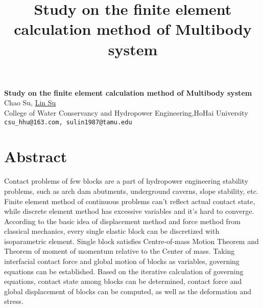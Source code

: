 \title{Study on the finite element calculation method of Multibody system}
\author{} \institute{}

\begin{center}

\textbf{\Large Study on the finite element calculation method of Multibody system}\\
\vspace{10mm}
{\large Chao Su, \underline{Lin Su}}\\
College of Water Conservancy and Hydropower Engineering,HoHai University\\
{\tt csu\_hhu@163.com, sulin1987@tamu.edu}

\end{center}

\section*{Abstract}

Contact problems of few blocks are a part of hydropower engineering stability problems, such as arch dam abutments, underground caverns, slope stability, etc. Finite element method of continuous problems can't reflect actual contact state, while discrete element method has excessive variables and it's hard to converge. According to the basic idea of displacement method and force method from classical mechanics, every single elastic block can be discretized with isoparametric element. Single block satisfies Centre-of-mass Motion Theorem and Theorem of moment of momentum relative to the Center of mass. Taking interfacial contact force and global motion of blocks as variables, governing equations can be established. Based on the iterative calculation of governing equations, contact state among blocks can be determined, contact force and global displacement of blocks can be computed, as well as the deformation and stress.

